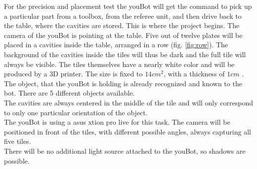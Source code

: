 \documentclass{article}
\begin{document}
For the precision and placement test the youBot will get the command to pick up a particular part from a toolbox, from the referee unit, and then drive back to the table, where the cavities are stored. This is where the project begins. The camera of the youBot is pointing at the table. Five out of twelve plates will be placed in a cavities inside the table, arranged in a row (fig. \ref{fig:row}). The background of the cavities inside the tiles will thus be dark and the full tile will always be visible. The tiles themselves have a nearly white color and will be produced by a 3D printer. The size is fixed to $14cm^2$, with a thickness of  $1cm$ .\\
The object, that the youBot is holding is already recognized and known to the bot. There are 5 different objects available.\\
The cavities are always centered in the middle of the tile and will only correspond to only one particular orientation of the object.\\
The youBot is using a asus xtion pro live for this task. The camera will be positioned in front of the tiles, with different possible angles, always capturing all five tiles. \\
There will be no additional light source attached to the youBot, so shadows are possible.\\
\end{document}
